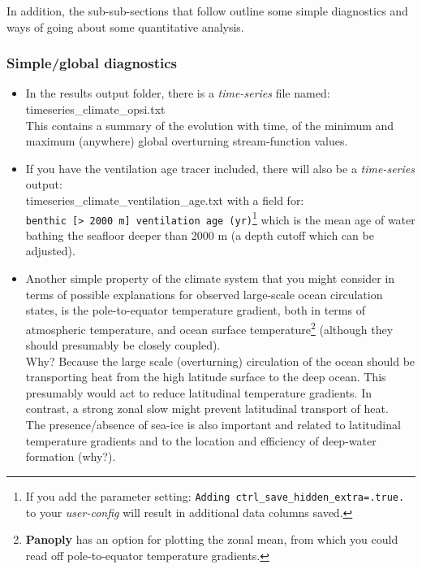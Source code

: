 \vspace{1mm}
In addition, the sub-sub-sections that follow outline some simple diagnostics and ways of going about some quantitative analysis.


\subsubsection{Simple/global diagnostics}

\vspace{1pt}
\begin{itemize}[noitemsep]
\vspace{1mm}
\item In the \textsf{\footnotesize results} output folder, there is a \textit{time-series} file named: \\\textsf{\footnotesize timeseries\_climate\_opsi.txt} \\This contains a summary of the evolution with time, of the minimum and maximum (anywhere) global overturning stream-function values.
\vspace{1mm}
\item If you have the ventilation age tracer included, there will also be a \textit{time-series} output:  \\\textsf{\footnotesize timeseries\_climate\_ventilation\_age.txt} with a field for: \\\texttt{\small benthic [> 2000 m] ventilation age (yr)}\footnote{If you add the parameter setting: \texttt{\small Adding ctrl\_save\_hidden\_extra=.true.} to your \textit{user-config} will result in additional data columns saved.} which is the mean age of water bathing the seafloor deeper than 2000 m (a depth cutoff which can be adjusted).
\vspace{1mm}
\item Another simple property of the climate system that you might consider in terms of possible explanations for observed large-scale ocean circulation states, is the pole-to-equator temperature gradient, both in terms of atmospheric temperature, and ocean surface temperature\footnote{\textbf{Panoply} has an option for plotting the zonal mean, from which you could read off pole-to-equator temperature gradients.} (although they should presumably be closely coupled).
\\Why? Because the large scale (overturning) circulation of the ocean should be transporting heat from the high latitude surface to the deep ocean. This presumably would act to reduce latitudinal temperature gradients. In contrast, a strong zonal slow might prevent latitudinal transport of heat.
\\The presence/absence of sea-ice is also important and related to latitudinal temperature gradients and to the location and efficiency of deep-water formation (why?). 
\end{itemize}

